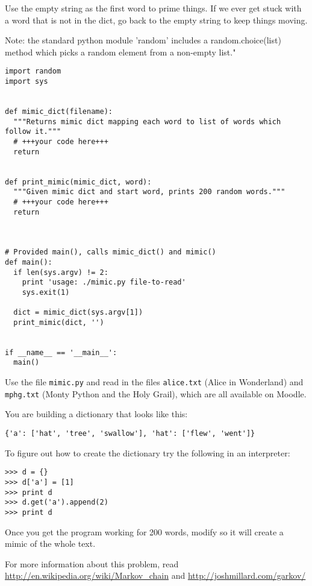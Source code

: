 \documentclass[12pt]{article}
\begin{document}
\begin{enumerate}
Use the empty string as the first word to prime things.
If we ever get stuck with a word that is not in the dict,
go back to the empty string to keep things moving.

Note: the standard python module 'random' includes a
random.choice(list) method which picks a random element
from a non-empty list."

\begin{verbatim}
import random
import sys


def mimic_dict(filename):
  """Returns mimic dict mapping each word to list of words which follow it."""
  # +++your code here+++
  return


def print_mimic(mimic_dict, word):
  """Given mimic dict and start word, prints 200 random words."""
  # +++your code here+++
  return



# Provided main(), calls mimic_dict() and mimic()
def main():
  if len(sys.argv) != 2:
    print 'usage: ./mimic.py file-to-read'
    sys.exit(1)

  dict = mimic_dict(sys.argv[1])
  print_mimic(dict, '')


if __name__ == '__main__':
  main() 
\end{verbatim}

Use the file \texttt{mimic.py} and read in the files \texttt{alice.txt} (Alice in Wonderland) and \texttt{mphg.txt} (Monty Python and the Holy Grail), which are all available on Moodle. 

You are building a dictionary that looks like this:

\begin{verbatim}
{'a': ['hat', 'tree', 'swallow'], 'hat': ['flew', 'went']}
\end{verbatim}

To figure out how to create the dictionary try the
following in an interpreter:

\begin{verbatim}
>>> d = {}
>>> d['a'] = [1]
>>> print d
>>> d.get('a').append(2)
>>> print d
\end{verbatim}

Once
you get the program working for 200 words, modify so it will create a
mimic of the whole text.

For more information about this problem, read \url{http://en.wikipedia.org/wiki/Markov_chain} and \url{http://joshmillard.com/garkov/} 

\end{enumerate}
\end{document}
